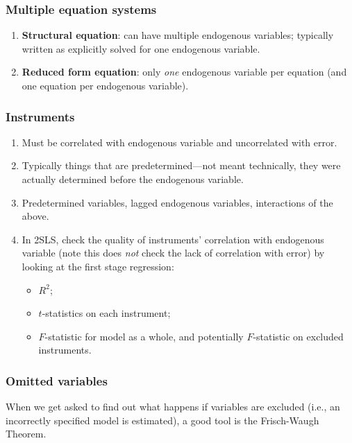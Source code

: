 \documentclass[8pt,letterpaper, landscape]{extarticle} %
\begin{document}
\begin{multicols}{3}
\begin{description}
\subsubsection*{Multiple equation systems}
\begin{enumerate}
\item \textbf{Structural equation}: can have multiple endogenous variables; typically written as explicitly solved for one endogenous variable.
\item \textbf{Reduced form equation}: only \textit{one} endogenous variable per equation (and one equation per endogenous variable).
\end{enumerate}

\subsubsection*{Instruments}
\begin{enumerate}
\item Must be correlated with endogenous variable and uncorrelated with error.
\item Typically things that are predetermined---not meant technically, they were actually determined before the endogenous variable.
\item Predetermined variables, lagged endogenous variables, interactions of the above.
\item In 2SLS, check the quality of instruments' correlation with endogenous variable (note this does \textit{not} check the lack of correlation with error) by looking at the first stage regression:
\begin{itemize}
\item $ R^2 $;
\item $ t $-statistics on each instrument;
\item $ F $-statistic for model as a whole, and potentially $ F $-statistic on excluded instruments.
\end{itemize}
\end{enumerate}

\subsubsection*{Omitted variables}
When we get asked to find out what happens if variables are excluded (i.e., an incorrectly specified model is estimated), a good tool is the Frisch-Waugh Theorem.


\end{description}
\end{multicols}
\end{document}
